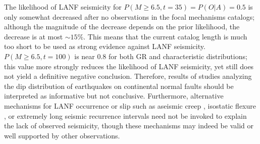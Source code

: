 \documentclass[twocolumn,grl]{AGUTeX}
\begin{document}
\begin{article}

The likelihood of LANF seismicity for $P(M\ge6.5, t=35) = P(O|A) = 0.5 $ is
only somewhat decreased after no observations in the focal mechanisms catalogs;
although the magnitude of the decrease depends on the prior likelihood, the
decrease is at most $\sim 15 \%$. This means that the current catalog length is
much too short to be used as strong evidence against LANF seismicity.
$P(M\ge6.5, t=100)$ is near 0.8 for both GR and characteristic distributions;
this value more strongly reduces the likelihood of LANF seismicity, yet still
does not yield a definitive negative conclusion.  Therefore, results of studies
analyzing the dip distribution of earthquakes on continental normal faults
\citep{jackson1987, collettinisibson2001} should be interpreted as informative
but not conclusive. Furthermore, alternative mechanisms for LANF occurrence or
slip such as aseismic creep \citep [e.g.,][]{collettini2011lanfmech,
hreinsdottir2009altotib}, isostatic flexure \citep[e.g.,][]
{wernickeaxen1988rolling}, or extremely long seismic recurrence intervals
\citep{wernicke1995seis} need not be invoked to explain the lack of observed
seismicity, though these mechanisms may indeed be valid or well supported by
other observations.



\end{article}
\end{document}
